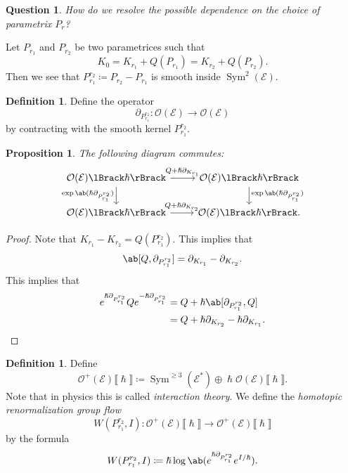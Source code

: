 \documentclass{amsart}
\newtheorem{prop}[thm]{Proposition}
\newtheorem{quest}[thm]{Question}
\theoremstyle{definition}
\newtheorem{defn}[thm]{Definition}
\theoremstyle{remark}
\theoremstyle{plain}
\theoremstyle{definition}
\theoremstyle{remark}
\newcommand{\mc}[1]{\mathcal{#1}}
\newcommand{\1}{\mathbf{1}}
\newcommand{\2}{\mathbf{2}}
\newcommand{\3}{\mathbf{3}}
\newcommand{\ps}[1]{\lBrack #1 \rBrack}
\DeclareMathOperator{\Sym}{Sym}
\begin{document}
\begin{quest}
    How do we resolve the possible dependence on the choice of parametrix \(P_r\)?
\end{quest}

Let \(P_{r_1}\) and \(P_{r_2}\) be two parametrices such that
\[ K_0 = K_{r_1} + Q(P_{r_1}) = K_{r_2} + Q(P_{r_2}). \]
Then we see that \(P_{r_1}^{r_2} \coloneqq P_{r_2} - P_{r_1}\) is smooth inside \(\Sym^2(\mc{E})\).

\begin{defn}
    Define the operator
    \[ \partial_{P_{r_1}^{r_2}} \colon \mc{O}(\mc{E}) \to \mc{O}(\mc{E}) \]
    by contracting with the smooth kernel \(P_{r_1}^{r_2}\). 
\end{defn}

\begin{prop}
    The following diagram commutes:
    \begin{equation*}
    \begin{tikzcd}
        \mc{O}(\mc{E})\ps{\hslash} \ar{r}{Q + \hslash \partial_{K_{r_1}}} \ar{d}[swap]{\exp\ab(\hslash \partial_{P_{r_1}^{r_2}})} & \mc{O}(\mc{E})\ps{\hslash} \ar{d}{\exp\ab(\hslash \partial_{P_{r_1}^{r_2}})} \\
        \mc{O}(\mc{E})\ps{\hslash} \ar{r}{Q + \hslash \partial_{K_{r_2}}} & \mc{O}(\mc{E})\ps{\hslash}.
    \end{tikzcd}
    \end{equation*}
\end{prop}

\begin{proof}
    Note that \(K_{r_1} - K_{r_2} = Q(P_{r_1}^{r_2})\). This implies that
    \[ \ab[Q, \partial_{P_{r_1}^{r_2}}] = \partial_{K_{r_1}} - \partial_{K_{r_2}}. \]
    This implies that
    \begin{align*}
        e^{\hslash \partial_{P_{r_1}^{r_2}}} Q e^{-\hslash \partial_{P_{r_1}^{r_2}}} &= Q + \hslash \ab[\partial_{P_{r_1}^{r_2}}, Q] \\
        &= Q + \hslash \partial_{K_{r_2}} - \hslash \partial_{K_{r_1}}. \qedhere
    \end{align*}
\end{proof}

\begin{defn}
    Define
    \[ \mc{O}^+(\mc{E}) \ps{\hslash} \coloneqq \Sym^{\geq 3}(\mc{E}^*) \oplus \hslash \mc{O}(\mc{E}) \ps{\hslash}. \]
    Note that in physics this is called \textit{interaction theory}. We define the \textit{homotopic renormalization group flow}
    \[ W(P_{r_1}^{r_2}, I) \colon \mc{O}^+(\mc{E}) \ps{\hslash} \to \mc{O}^+(\mc{E}) \ps{\hslash} \]
    by the formula
    \[ W(P_{r_1}^{r_2}, I) \coloneqq \hslash \log \ab( e^{\hslash \partial_{P_{r_1}^{r_2}}} e^{I/\hslash}). \]
\end{defn}
\end{document}
